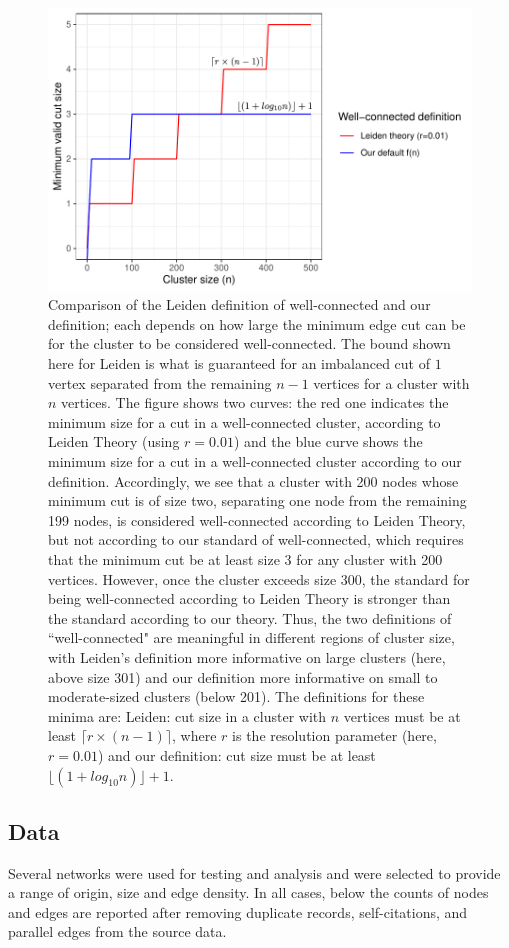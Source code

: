 \documentclass[a4paper]{article}   	%
\begin{document}
\begin{figure}[H]
\centering
\includegraphics[width=0.7\linewidth]{figs/well_connected_definition.pdf}
\caption{Comparison of the Leiden definition of well-connected and our definition; each depends on how large the
minimum edge cut can be for the cluster to be considered well-connected.
The bound shown here for Leiden is what is guaranteed for an imbalanced cut of $1$ vertex separated from the remaining $n-1$ vertices
for a cluster with $n$ vertices.
The figure shows two curves: the red one indicates the minimum size for a cut in a well-connected cluster,
according to Leiden Theory (using $r=0.01$) and the blue curve shows the minimum size for a cut in a well-connected cluster according to
our definition.
Accordingly, we see that a cluster with 200 nodes whose minimum cut is of size two, separating one node from the remaining 199 nodes, is considered well-connected
according to Leiden Theory, but not according to our standard of well-connected, which requires that the minimum cut be at least size
3 for any cluster with 200 vertices.  However, once the cluster exceeds size 300, the standard for being well-connected according to
Leiden Theory is stronger than the standard according to our theory. Thus, the two definitions of ``well-connected"  are meaningful in different
regions of cluster size, with Leiden's definition more informative on large clusters (here, above size 301) and our definition more informative on small to moderate-sized clusters (below 201).
The definitions for these minima are: Leiden:  cut size  in a cluster with $n$ vertices must be at least $\lceil r \times (n-1) \rceil$, where $r$ is the resolution parameter (here, $r=0.01$)
and our definition: cut size must be at least $\lfloor(1 + log_{10}n)\rfloor +1$.}
\end{figure}

 \subsection{Data} Several networks were used for testing and analysis and were selected to provide a range of origin, size and edge density. In all cases, below the counts of nodes and edges are reported after removing duplicate records,
self-citations, and parallel edges from the source data.
\end{document}
